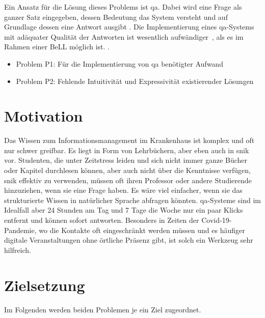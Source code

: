 Ein Ansatz für die Lösung dieses Problems ist \acl*{qa}.
Dabei wird eine Frage als ganzer Satz eingegeben, dessen Bedeutung das System versteht und auf Grundlage dessen eine Antwort ausgibt \citep{qadefinition}.
Die Implementierung eines \acl*{qa}-Systems mit adäquater Qualität der Antworten ist wesentlich aufwändiger~\citep[S.~3]{qanswer}, als es im Rahmen einer BeLL möglich ist.
.
\begin{itemize}
	\item Problem P1: Für die Implementierung von \acl{qa} benötigter Aufwand
	\item Problem P2: Fehlende Intuitivität und Expressivität existierender Lösungen
\end{itemize}

\section{Motivation}

Das Wissen zum Informationsmanagement im Krankenhaus ist komplex und oft nur schwer greifbar.
Es liegt in Form von Lehrbüchern, aber eben auch in \acs{snik} vor.
Studenten, die unter Zeitstress leiden und sich nicht immer ganze Bücher oder Kapitel durchlesen können, aber auch nicht über die Kenntnisse verfügen, \acs{snik} effektiv zu verwenden,
müssen oft ihren Professor oder andere Studierende hinzuziehen, wenn sie eine Frage haben.
Es wäre viel einfacher, wenn sie das strukturierte Wissen in natürlicher Sprache abfragen könnten.
\acl*{qa}-Systeme sind im Idealfall aber 24 Stunden am Tag und 7 Tage die Woche nur ein paar Klicks entfernt und können sofort antworten. 
Besonders in Zeiten der Covid-19-Pandemie, wo die Kontakte oft eingeschränkt werden müssen und es häufiger digitale Veranstaltungen ohne örtliche Präsenz gibt, ist solch ein Werkzeug sehr hilfreich.

\section{Zielsetzung}\label{sec:zielsetzung}

Im Folgenden werden beiden Problemen je ein Ziel zugeordnet.


